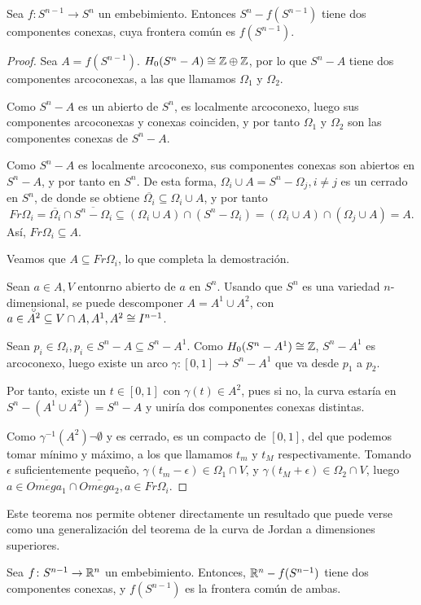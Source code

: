 \begin{theorem}
  Sea $f \colon S^{n-1} \to S^n$ un embebimiento. Entonces $S^n - f(S^{n-1})$ tiene dos componentes conexas,
  cuya frontera común es $f(S^{n-1})$.
\end{theorem}

\begin{proof}
  Sea $A = f(S^{n-1})$. $H_0(S^n - A) \cong \mathbb{Z} \oplus \mathbb{Z}$, por lo que $S^n - A$ tiene dos componentes arcoconexas,
  a las que llamamos $\Omega_1$ y $\Omega_2$.

  Como $S^n - A$ es un abierto de $S^n$, es localmente arcoconexo, luego sus componentes arcoconexas y conexas coinciden,
  y por tanto $\Omega_1$ y $\Omega_2$ son las componentes conexas de $S^n - A$.

  Como $S^n - A$ es localmente arcoconexo, sus componentes conexas son abiertos en $S^n -A$, y por tanto en $S^n$.
  De esta forma, $\Omega_i \cup A = S^n - \Omega_j, i \neq j$ es un cerrado en $S^n$, de donde se obtiene
  $\overline{\Omega_i} \subseteq \Omega_i \cup A$, y por tanto
  \[ Fr \Omega_i = \overline{\Omega_i} \cap \overline{S^n - \Omega_i} \subseteq (\Omega_i \cup A) \cap (S^n - \Omega_i) =
  (\Omega_i \cup A) \cap (\Omega_j \cup A) = A. \]
  Así, $Fr \Omega_i \subseteq A$.

  Veamos que $A \subseteq Fr \Omega_i$, lo que completa la demostración.

  Sean $a \in A, V$ entonrno abierto de $a$ en $S^n$. Usando que $S^n$ es una variedad $n$-dimensional, se puede descomponer
  $A = A^1 \cup A^2$, con $a \in \interior{A^2} \subseteq V \cap A, A^1, A^2 \cong I^{n-1}$.

  Sean $p_i \in \Omega_i, p_i \in S^n - A \subseteq S^n - A^1$. Como $H_0(S^n - A^1) \cong \mathbb{Z}$, $S^n - A^1$ es arcoconexo,
  luego existe un arco $\gamma \colon [0,1] \to S^n - A^1$ que va desde $p_1$ a $p_2$.

  Por tanto, existe un $t \in [0,1]$ con $\gamma(t) \in A^2$, pues si no, la curva estaría en $S^n - (A^1 \cup A^2) = S^n - A$
  y uniría dos componentes conexas distintas.

  Como $\gamma^{-1}(A^2) \neg \emptyset$ y es cerrado, es un compacto de $[0,1]$, del que podemos tomar mínimo y máximo,
  a los que llamamos $t_m$ y $t_M$ respectivamente. Tomando $\epsilon$ suficientemente pequeño, $\gamma(t_m - \epsilon) \in \Omega_1 \cap V$,
  y $\gamma(t_M + \epsilon) \in \Omega_2 \cap V$, luego $a \in \overline{Omega_1} \cap \overline{Omega_2}, a \in Fr \Omega_i$.
\end{proof}

Este teorema nos permite obtener directamente un resultado que puede verse como una generalización del teorema
de la curva de Jordan a dimensiones superiores.

\begin{corollary}
  Sea $f \colon S^{n-1} \to \mathbb{R}^n$ un embebimiento. Entonces, $\mathbb{R}^n - f(S^{n-1})$ tiene dos componentes conexas,
  y $f(S^{n-1})$ es la frontera común de ambas.
\end{corollary}
